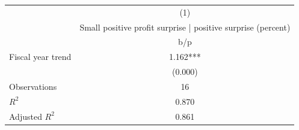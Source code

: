 {
\def\sym#1{\ifmmode^{#1}\else\(^{#1}\)\fi}
\begin{tabular}{l*{1}{c}}
\hline\hline
                    &\multicolumn{1}{c}{(1)}\\
                    &\multicolumn{1}{c}{Small positive profit surprise | positive surprise (percent)}\\
                    &         b/p   \\
\hline
Fiscal year trend   &       1.162***\\
                    &     (0.000)   \\
\hline
Observations        &          16   \\
\(R^{2}\)           &       0.870   \\
Adjusted \(R^{2}\)  &       0.861   \\
\hline\hline
\end{tabular}
}
